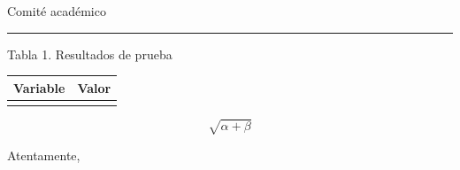 \documentclass[12pt,a4paper]{letter}
\begin{document}
\begin{letter}{Comité académico}
\par\medskip\noindent\rule{\linewidth}{0.4pt}\par\medskip

\par\medskip{}\label{n1347B508-3672-47ED-9C14-5B63C1697D76}{\small Tabla 1. Resultados de prueba\par}
\begin{tabularx}{\linewidth}{|>{\raggedright\arraybackslash}X|>{\raggedright\arraybackslash}X|}\hline
\textbf{Variable} & \textbf{Valor} \\ \hline
 &  \\ \hline
\end{tabularx}\par{\small }

\begin{equation}\sqrt{\alpha  + \beta }\label{n6A3148D6-BC0C-4681-BC51-6FE3E1F2A357}\end{equation}

\closing{Atentamente,}
\end{letter}
\end{document}
